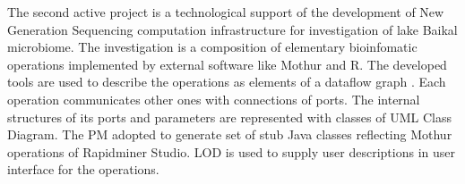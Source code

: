 \documentclass[runningheads]{llncs}
\begin{document}
The second active project is a technological support of the development of New Generation Sequencing computation infrastructure for investigation of lake Baikal microbiome.  The investigation is a composition of elementary bioinfomatic operations implemented by external software like Mothur and R.  The developed tools are used to describe the operations as elements of a dataflow graph \cite{dataflow}.  Each operation communicates other ones with connections of ports.  The internal structures of its ports and parameters are represented with classes of UML Class Diagram.  The PM adopted to generate set of stub Java classes reflecting Mothur operations of Rapidminer Studio.  LOD is used to supply user descriptions in user interface for the operations.





\end{document}
